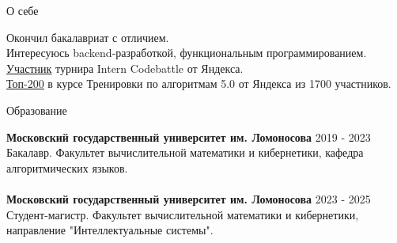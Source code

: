\documentclass{resume} %
\begin{document}

\begin{rSection}{О себе}

{Окончил бакалавриат с отличием. } \\
{Интересуюсь backend-разработкой, функциональным программированием.}  \\
{\href{https://github.com/tymillnyc/aboutme/blob/main/proofs/codebattle_ydx.pdf} 
{\underline{Участник}} турнира \textquotedbl{}Intern Codebattle\textquotedbl{} от Яндекса.} \\ 
{\href{https://github.com/tymillnyc/aboutme/blob/main/proofs/train5_ydx.pdf.pdf}
{\underline{Топ-200}} в курсе \textquotedbl{}Тренировки по алгоритмам 5.0\textquotedbl{} от Яндекса из 1700 участников.}


\end{rSection}

\begin{rSection}{Образование}

{\bf Московский государственный университет им. Ломоносова}  \hfill {2019 - 2023} \\
{ Бакалавр. Факультет вычислительной математики и кибернетики, кафедра алгоритмических языков.} \\ \\
{\bf Московский государственный университет им. Ломоносова}  \hfill {2023 - 2025} \\
{ Студент-магистр. Факультет вычислительной математики и кибернетики, направление "Интеллектуальные системы".} 

\end{rSection}
\end{document}
